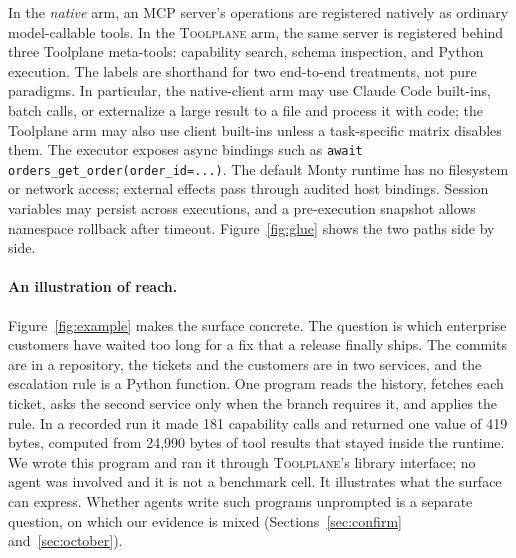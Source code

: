 \documentclass[10pt,twocolumn]{article}
\newcommand{\toolplane}{\textsc{Toolplane}\xspace}
\begin{document}
In the \emph{native} arm, an MCP server's operations are registered natively as
ordinary model-callable tools.  In the \toolplane arm, the same server is
registered behind three Toolplane meta-tools: capability search, schema
inspection, and Python execution.  The labels are shorthand for two
end-to-end treatments, not pure paradigms.  In particular, the native-client
arm may use Claude Code built-ins, batch calls, or externalize a large result
to a file and process it with code; the Toolplane arm may also use client
built-ins unless a task-specific matrix disables them.  The executor exposes
async bindings such as
\texttt{await orders\_get\_order(order\_id=...)}.  The default Monty runtime
has no filesystem or network access; external effects pass through audited
host bindings.  Session variables may persist across executions, and a
pre-execution snapshot allows namespace rollback after timeout.
Figure~\ref{fig:glue} shows the two paths side by side.


\paragraph{An illustration of reach.}
Figure~\ref{fig:example} makes the surface concrete.  The question is which
enterprise customers have waited too long for a fix that a release finally
ships.  The commits are in a repository, the tickets and the customers are in
two services, and the escalation rule is a Python function.  One program
reads the history, fetches each ticket, asks the second service only when the
branch requires it, and applies the rule.  In a recorded run it made 181
capability calls and returned one value of 419 bytes, computed from 24,990
bytes of tool results that stayed inside the runtime.  We wrote this
program and ran it through \toolplane's library interface; no agent was
involved and it is not a benchmark cell.  It illustrates what the surface can
express.  Whether agents write such programs unprompted is a separate
question, on which our evidence is mixed (Sections~\ref{sec:confirm}
and~\ref{sec:october}).
\end{document}
